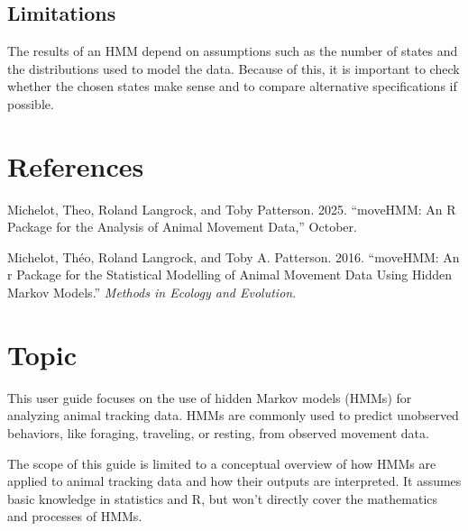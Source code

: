 \documentclass[
  letterpaper,
  DIV=11,
  numbers=noendperiod]{scrreprt}
\newlength{\cslhangindent}
\newenvironment{CSLReferences}[2] %
 {\begin{list}{}{%
  \setlength{\itemindent}{0pt}
  \setlength{\leftmargin}{0pt}
  \setlength{\parsep}{0pt}
  \ifodd #1
   \setlength{\leftmargin}{\cslhangindent}
   \setlength{\itemindent}{-1\cslhangindent}
  \fi
  \setlength{\itemsep}{#2\baselineskip}}}
 {\end{list}}
\begin{document}
\section{Limitations}\label{limitations}

The results of an HMM depend on assumptions such as the number of states
and the distributions used to model the data. Because of this, it is
important to check whether the chosen states make sense and to compare
alternative specifications if possible.


\chapter*{References}\label{references}


\label{refs}
\begin{CSLReferences}{1}{0}
Michelot, Theo, Roland Langrock, and Toby Patterson. 2025. {``{moveHMM}:
An {R} Package for the Analysis of Animal Movement Data,''} October.

Michelot, Théo, Roland Langrock, and Toby A. Patterson. 2016.
{``moveHMM: An r Package for the Statistical Modelling of Animal
Movement Data Using Hidden Markov Models.''} \emph{Methods in Ecology
and Evolution}.

\end{CSLReferences}

\cleardoublepage
{}
{}
\appendix

\chapter{Topic}\label{topic}

This user guide focuses on the use of hidden Markov models (HMMs) for
analyzing animal tracking data. HMMs are commonly used to predict
unobserved behaviors, like foraging, traveling, or resting, from
observed movement data.

The scope of this guide is limited to a conceptual overview of how HMMs
are applied to animal tracking data and how their outputs are
interpreted. It assumes basic knowledge in statistics and R, but won't
directly cover the mathematics and processes of HMMs.
\end{document}
